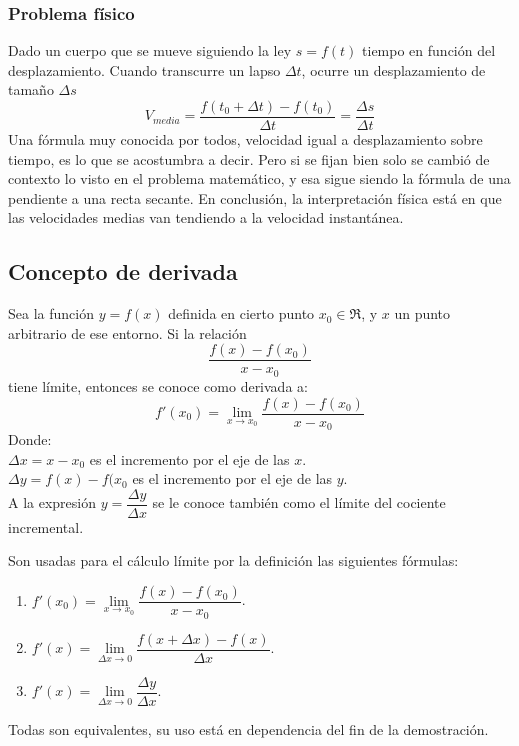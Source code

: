 \documentclass[10pt,twoside]{SelfArx} %
\begin{document}
\subsubsection{Problema físico}
Dado un cuerpo que se mueve siguiendo la ley $ s=f(t) $ tiempo en función del desplazamiento. Cuando transcurre un lapso  $ \Delta t $, ocurre un desplazamiento de tamaño $ \Delta s $
\begin{equation}
V_{media}=\dfrac{f(t_{0}+\Delta t)-f(t_{0})}{\Delta t}=\dfrac{\Delta s}{\Delta t}
\end{equation}
Una fórmula muy conocida por todos, \textsf{velocidad igual a desplazamiento sobre tiempo}, es lo que se acostumbra a decir. Pero si se fijan bien solo se cambió de contexto lo visto en el problema matemático, y esa sigue siendo la fórmula de una pendiente a una recta secante. En conclusión, la interpretación física está en que las velocidades medias van tendiendo a la velocidad instantánea.






\subsection{Concepto de derivada}

\begin{thm}
Sea la función $ y=f(x) $ definida en cierto punto $ x_{0}\in\Re $, y $ x $ un punto arbitrario de ese entorno. Si la relación
\[ \dfrac{f(x)-f(x_{0})}{x-x_{0}} \]
tiene límite, entonces se conoce como derivada a:
\[ f'(x_{0})=\lim\limits_{x\rightarrow x_{0}}\dfrac{f(x)-f(x_{0})}{x-x_{0}} \]
Donde:\\
$ \Delta x= x-x_{0} $ es el incremento por el eje de las $ x $.\\
$ \Delta y=f(x)-f(x_{0} $ es el incremento por el eje de las $ y $.\\

A la expresión $ y=\dfrac{\Delta y}{\Delta x} $ se le conoce también como el límite del cociente incremental.
	
\end{thm}
Son usadas para el c\'alculo límite por la definición las siguientes fórmulas:
\begin{enumerate}\label{ecuaciones_derivadas}
	\item $ f'(x_{0})=\lim\limits_{x\rightarrow x_{0}}\dfrac{f(x)-f(x_{0})}{x-x_{0}} $.
	\item $ f'(x)=\lim\limits_{\Delta x\rightarrow 0}\dfrac{f(x+\Delta x)-f(x)}{\Delta x} $.
	\item $ f'(x)=\lim\limits_{\Delta x\rightarrow 0}\dfrac{\Delta y}{\Delta x} $.
\end{enumerate}
Todas son equivalentes, su uso está en dependencia del fin de la demostración.
\end{document}
